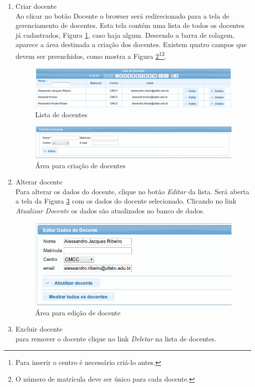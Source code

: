 \documentclass[openany,10pt,a4paper]{book}
\begin{document}
\begin{enumerate}
\item{Criar docente}\\
Ao clicar no botão Docente o browser será redirecionado para a tela de gerenciamento de docentes. Esta tela contém uma lista de todos os docentes já cadastrados, Figura \ref{im_listaDocentes}, caso haja algum. Descendo a barra de rolagem, aparece a área destinada a criação dos docentes. Existem quatro campos que devem ser preenchidos, como mostra a Figura \ref{im_criarDocente}\footnote{Para inserir o centro é necessário criá-lo antes.}\footnote{O número de matrícula deve ser único para cada docente.}. 

\begin{figure}[!htb]
    \centering
    \includegraphics[scale=0.32]{listaDocentes.png}
    \caption{Lista de docentes}
    \label{im_listaDocentes}
\end{figure}

\begin{figure}[!htb]
    \centering
    \includegraphics[scale=0.3]{criarDocente.png}
    \caption{Área para criação de docentes}
    \label{im_criarDocente}
\end{figure}


\item{Alterar docente}\\
Para alterar os dados do docente, clique no botão \textit{Editar} da lista. Será aberta a tela da Figura \ref{im_editarDocente} com os dados do docente selecionado. Clicando no link \textit{Atualizar Docente} os dados são atualizados no banco de dados.

\begin{figure}[!htb]
    \centering
    \includegraphics[scale=0.4]{editarDocente.png}
    \caption{Área para edição de docente}
    \label{im_editarDocente}
\end{figure}
\item{Excluir docente}\\
para remover o docente clique no link \textit{Deletar} na lista de docentes.
\end{enumerate}
\end{document}

